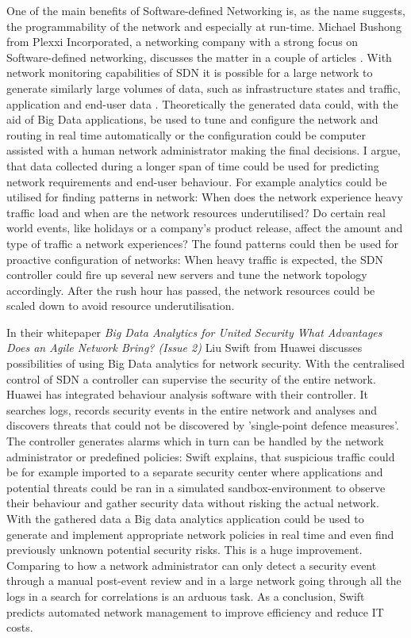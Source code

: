\documentclass{acm_proc_article-sp}
\begin{document}
One of the main benefits of Software-defined Networking is, as the name suggests, the programmability of the network and especially at run-time. Michael Bushong from Plexxi Incorporated, a networking company with a strong focus on Software-defined networking, discusses the matter in a couple of articles \cite{Bushong2013, Bushong2013-2}. With network monitoring capabilities of SDN it is possible for a large network to generate similarly large volumes of data, such as infrastructure states and traffic, application and end-user data \cite{Bushong2013}. Theoretically the generated data could, with the aid of Big Data applications, be used to tune and configure the network and routing in real time automatically or the configuration could be computer assisted with a human network administrator making the final decisions. I argue, that data collected during a longer span of time could be used for predicting network requirements and end-user behaviour. For example analytics could be utilised for finding patterns in network: When does the network experience heavy traffic load and when are the network resources underutilised? Do certain real world events, like holidays or a company's product release, affect the amount and type of traffic a network experiences? The found patterns could then be used for proactive configuration of networks: When heavy traffic is expected, the SDN controller could fire up several new servers and tune the network topology accordingly. After the rush hour has passed, the network resources could be scaled down to avoid resource underutilisation.

In their whitepaper \textit{Big Data Analytics for United Security \textendash What Advantages Does an Agile Network Bring? (Issue 2)} \cite{Liu2014} Liu Swift from Huawei discusses possibilities of using Big Data analytics for network security. With the centralised control of SDN a controller can supervise the security of the entire network. Huawei has integrated behaviour analysis software with their controller. It searches logs, records security events in the entire network and analyses and discovers threats that could not be discovered by 'single-point defence measures'. The controller generates alarms which in turn can be handled by the network administrator or predefined policies: Swift explains, that suspicious traffic could be for example imported to a separate security center where applications and potential threats could be ran in a simulated sandbox-environment to observe their behaviour and gather security data without risking the actual network. With the gathered data a Big data analytics application could be used to generate and implement appropriate network policies in real time and even find previously unknown potential security risks. This is a huge improvement. Comparing to how a network administrator can only detect a security event through a manual post-event review and in a large network going through all the logs in a search for correlations is an arduous task. As a conclusion, Swift predicts automated network management to improve efficiency and reduce IT costs. 
\end{document}
